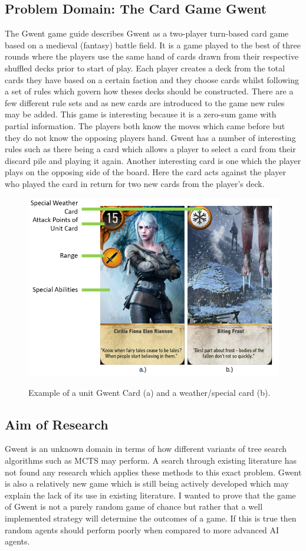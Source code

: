 \documentclass[journal]{IEEEtran}
\begin{document}
  \subsection{Problem Domain: The Card Game Gwent}
  The Gwent game guide \cite{guide} describes Gwent as a two-player turn-based card game based on a medieval (fantasy) battle field. It is a game played to the best of three rounds where the players use the same hand of cards drawn from their respective shuffled decks prior to start of play. Each player creates a deck from the total cards they have based on a certain faction and they choose cards whilst following a set of rules which govern how theses decks should be constructed. There are a few different rule sets and as new cards are introduced to the game new rules may be added. This game is interesting because it is a zero-sum game with partial information. The players both know the moves which came before but they do not know the opposing players hand. Gwent has a number of interesting rules such as there being a card which allows a player to select a card from their discard pile and playing it again. Another interesting card is one which the player plays on the opposing side of the board. Here the card acts against the player who played the card in return for two new cards from the player’s deck.

  \begin{figure}[H]
    \includegraphics[width=.45\textwidth,scale=.45]{card}\\
    \centering
    \caption{Example of a unit Gwent Card (a) and a weather/special card (b). \cite{guide} \cite{cdp}}
  \end{figure}
  
  \subsection{Aim of Research}
  Gwent is an unknown domain in terms of how different variants of tree search algorithms such as MCTS may perform. A search through existing literature has not found any research which applies these methods to this exact problem. Gwent is also a relatively new game which is still being actively developed \cite{cdp} which may explain the lack of its use in existing literature. I wanted to prove that the game of Gwent is not a purely random game of chance but rather that a well implemented strategy will determine the outcomes of a game. If this is true then random agents should perform poorly when compared to more advanced AI agents.\\
\end{document}
